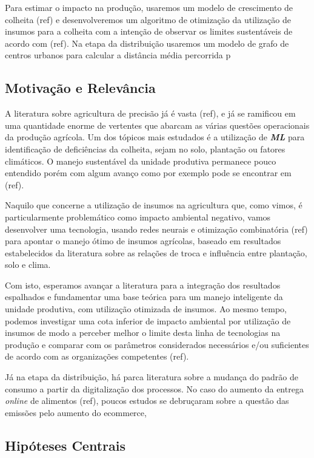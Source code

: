 \documentclass[14pt,a4paper]{article}
\begin{document}
		Para estimar o impacto na produção, usaremos um modelo de crescimento de colheita (ref) e desenvolveremos um algoritmo de otimização da utilização de insumos para a colheita com a intenção de observar os limites sustentáveis de acordo com (ref). Na etapa da distribuição usaremos um modelo de grafo de centros urbanos para calcular a distância média percorrida p

	\subsection{Motivação e Relevância}

		A literatura sobre agricultura de precisão já é vasta (ref), e já se ramificou em uma quantidade enorme de vertentes que abarcam as várias questões operacionais da produção agrícola. Um dos tópicos mais estudados é a utilização de \textit{\textbf{ML}} para identificação de deficiências da colheita, sejam no solo, plantação ou fatores climáticos. O manejo sustentável da unidade produtiva permanece pouco entendido porém com algum avanço como por exemplo pode se encontrar em (ref). 
		
		Naquilo que concerne a utilização de insumos na agricultura que, como vimos, é particularmente problemático como impacto ambiental negativo, vamos desenvolver uma tecnologia, usando redes neurais e otimização combinatória (ref) para apontar o manejo ótimo de insumos agrícolas, baseado em resultados estabelecidos da literatura sobre as relações de troca e influência entre plantação, solo e clima. 
		
		Com isto, esperamos avançar a literatura para a integração dos resultados espalhados e fundamentar uma base teórica para um manejo inteligente da unidade produtiva, com utilização otimizada de insumos. Ao mesmo tempo, podemos investigar uma cota inferior de impacto ambiental por utilização de insumos de modo a perceber melhor o limite desta linha de tecnologias na produção e comparar com os parâmetros considerados necessários e/ou suficientes de acordo com as organizações competentes (ref).
		
		Já na etapa da distribuição, há parca literatura sobre a mudança do padrão de consumo a partir da digitalização dos processos. No caso do aumento da entrega \textit{online} de alimentos (ref), poucos estudos se debruçaram sobre a questão das emissões pelo aumento do ecommerce, 

	
	\subsection{Hipóteses Centrais}
	
\end{document}
